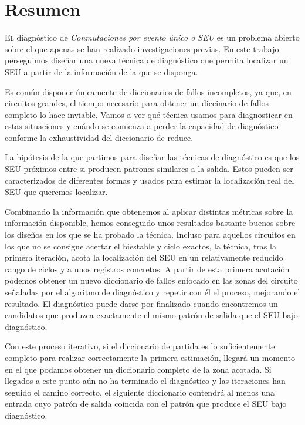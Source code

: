 \chapter*{Resumen}
\pagestyle{especial}
{}

\lettrine[lraise=-0.1, lines=2, loversize=0.2]{E}{l} diagnóstico de
\textit{Conmutaciones por evento único o \gls{SEU}} es un problema abierto sobre 
el que apenas se han realizado investigaciones previas. En este trabajo 
perseguimos diseñar una nueva técnica de diagnóstico que permita localizar un 
\gls{SEU} a partir de la información de la que se disponga.

Es común disponer únicamente de diccionarios de fallos incompletos, ya que, en
circuitos grandes, el tiempo necesario para obtener un diccinario de fallos
completo lo hace inviable. Vamos a ver qué técnica usamos para diagnosticar en
estas situaciones y cuándo se comienza a perder la capacidad de diagnóstico
conforme la exhaustividad del diccionario de reduce.

La hipótesis de la que partimos para diseñar las técnicas de diagnóstico es que
los \gls{SEU} próximos entre si producen patrones similares a la salida. Estos
pueden ser caracterizados de diferentes formas y usados para estimar la
localización real del \gls{SEU} que queremos localizar.

Combinando la información que obtenemos al aplicar distintas métricas sobre la
información disponible, hemos conseguido unos resultados bastante buenos sobre los
diseños en los que se ha probado la técnica. Incluso para aquellos circuitos en
los que no se consigue acertar el biestable y ciclo exactos, la técnica, tras la
primera iteración, acota la localización del \gls{SEU} en un relativamente 
reducido rango de ciclos y a unos registros concretos. A partir de esta primera
acotación podemos obtener un nuevo diccionario de fallos enfocado en las zonas del
circuito señaladas por el algoritmo de diagnóstico y repetir con él el proceso,
mejorando el resultado. El diagnóstico puede darse por finalizado cuando
encontremos un candidatos que produzca exactamente el mismo patrón de salida que
el \gls{SEU} bajo diagnóstico.

Con este proceso iterativo, si el diccionario de partida es lo suficientemente
completo para realizar correctamente la primera estimación, llegará un momento en
el que podamos obtener un diccionario completo de la zona acotada. Si llegados a
este punto aún no ha terminado el diagnóstico y las iteraciones han seguido el 
camino correcto, el siguiente diccionario contendrá al menos una entrada cuyo 
patrón de salida coincida con el patrón que produce el \gls{SEU} bajo diagnóstico.

